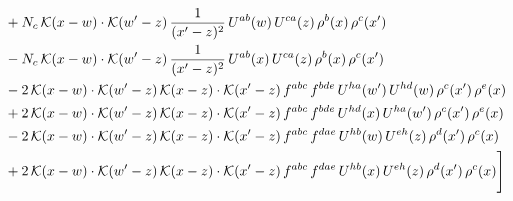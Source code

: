 \documentclass[10pt]{article}
\numberwithin{equation}{section}
\begin{document}
\begin{align}
&+N_{c}\,\mathcal{K}(x-w)\cdot\mathcal{K}(w'-z)\,\frac{1}{(x'-z)^{2}}\,U^{ab}(w)\,U^{ca}(z)\,\rho^{b}(x)\,\rho^{c}(x')\notag\\
&-N_{c}\,\mathcal{K}(x-w)\cdot\mathcal{K}(w'-z)\,\frac{1}{(x'-z)^{2}}\,U^{ab}(x)\,U^{ca}(z)\,\rho^{b}(x)\,\rho^{c}(x')\notag\\
&-2\,\mathcal{K}(x-w)\cdot\mathcal{K}(w'-z)\,\mathcal{K}(x-z)\cdot\mathcal{K}(x'-z)\,f^{abc}\,f^{bde}\,U^{ha}(w')\,U^{hd}(w)\,\rho^{c}(x')\,\rho^{e}(x)\notag\\
&+2\,\mathcal{K}(x-w)\cdot\mathcal{K}(w'-z)\,\mathcal{K}(x-z)\cdot\mathcal{K}(x'-z)\,f^{abc}\,f^{bde}\,U^{hd}(x)\,U^{ha}(w')\,\rho^{c}(x')\,\rho^{e}(x)\notag\\
&-2\,\mathcal{K}(x-w)\cdot\mathcal{K}(w'-z)\,\mathcal{K}(x-z)\cdot\mathcal{K}(x'-z)\,f^{abc}\,f^{dae}\,U^{hb}(w)\,U^{eh}(z)\,\rho^{d}(x')\,\rho^{c}(x)\notag\\
&+2\,\mathcal{K}(x-w)\cdot\mathcal{K}(w'-z)\,\mathcal{K}(x-z)\cdot\mathcal{K}(x'-z)\,f^{abc}\,f^{dae}\,U^{hb}(x)\,U^{eh}(z)\,\rho^{d}(x')\,\rho^{c}(x)\Bigg]
\end{align}
\end{document}
